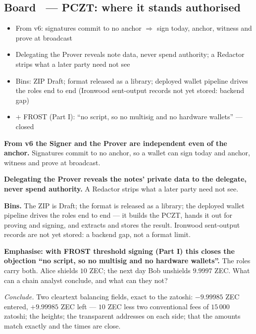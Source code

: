 \documentclass[11pt,a4paper]{article}
\makeatletter
\newcounter{board}
\newenvironment{board}[2]{\stepcounter{board}%
  \subsection*{Board \theboard\ --- #1 \hfill {\normalfont\small\color{arb}#2}}}{\medskip}
\newcommand{\Write}{\draw@head{Write}}
\newcommand{\Say}{\draw@head{Say}}
\newcommand{\Ask}{\draw@head{Ask}}
\makeatother
\begin{document}
\begin{board}{PCZT: where it stands}{authorised}
\Write
\begin{itemize}
  \item From v6: signatures commit to no anchor $\Rightarrow$ sign today,
    anchor, witness and prove at broadcast
  \item Delegating the Prover reveals note data, never spend authority;
    a Redactor strips what a later party need not see
  \item Bins: ZIP Draft; format released as a library; deployed wallet
    pipeline drives the roles end to end (Ironwood sent-output records
    not yet stored: backend gap)
  \item $+$ FROST (Part I): ``no script, so no multisig and no hardware
    wallets'' --- closed
\end{itemize}
\Say
\textbf{From v6 the Signer and the Prover are independent even of the
anchor.} Signatures commit to no anchor, so a wallet can sign today and
anchor, witness and prove at broadcast.

\textbf{Delegating the Prover reveals the notes' private data to the
delegate, never spend authority.} A Redactor strips what a later party
need not see.

\textbf{Bins.} The ZIP is Draft; the format is released as a library; the
deployed wallet pipeline drives the roles end to end --- it builds the
PCZT, hands it out for proving and signing, and extracts and stores the
result. Ironwood sent-output records are not yet stored: a backend gap,
not a format limit.

\textbf{Emphasise: with FROST threshold signing (Part I) this closes the
objection ``no script, so no multisig and no hardware wallets''.} The
roles carry both.
\Ask
Alice shields $10$ ZEC; the next day Bob unshields $9.9997$ ZEC. What can
a chain analyst conclude, and what can they not?

\emph{Conclude.} Two cleartext balancing fields, exact to the zatoshi:
$-9.99985$ ZEC entered, $+9.99985$ ZEC left --- $10$ ZEC less two
conventional fees of $15\,000$ zatoshi; the heights; the transparent
addresses on each side; that the amounts match exactly and the times are
close.


\end{board}
\end{document}
